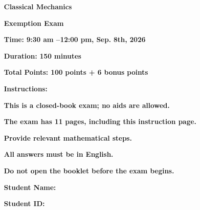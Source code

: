 \documentclass[11pt, a4paper]{article} %
\begin{document}

\setlength{\parindent}{0pt} %
\onehalfspacing %

\vspace*{0.1cm}

\begin{center}
	{\Large \textbf{Classical Mechanics}}
    \vspace*{2mm}

    {\Large \textbf{Exemption Exam }}
	\vspace{8mm}

{\Large \textbf{Time: 9:30 am --12:00 pm, Sep. 8th, 2026}}
\vspace*{2mm}

{\Large \textbf{Duration: 150 minutes}}
\vspace*{2mm}

{\Large \textbf{Total Points: 100 points + 6 bonus points}}
\end{center}
\vspace*{8mm}

{\Large \textbf{Instructions:}}
\vspace*{2mm}

{\Large \textbf{This is a closed-book exam; no aids are allowed.}}
\vspace*{2mm}

{\Large \textbf{The exam has 11 pages, including this instruction page.}}
\vspace*{2mm}

{\Large \textbf{Provide relevant mathematical steps.}}
\vspace*{2mm}

{\Large \textbf{All answers must be in English.}}
\vspace*{2mm}

{\Large \textbf{Do not open the booklet before the exam begins.}}
\vspace{5cm}

\begin{center}
{\Large \textbf{Student Name:} \underline{\hspace{4cm}}}
\vspace*{8mm}

{\Large \textbf{Student ID:} \underline{\hspace{4cm}}}
\vspace*{2mm}
\end{center}

\newpage
\end{document}
